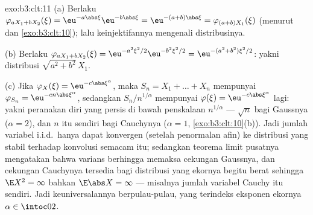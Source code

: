 \begin{solution}{exo:b3:clt:11}
(a) Berlaku $\varphi_{aX_1 + bX_2}(\xi) =
\eu^{-a\abs\xi}\eu^{-b\abs\xi} = \eu^{-(a+b)\abs\xi} =
\varphi_{(a+b)X_1}(\xi)$ (menurut  dan
\cref{exo:b3:clt:10}); lalu keinjektifannya mengenali distribusinya.

(b) Berlaku $\varphi_{aX_1+bX_2}(\xi) = \eu^{-a^2\xi^2/2}
\eu^{-b^2\xi^2/2} = \eu^{-(a^2+b^2)\xi^2/2}$: yakni distribusi
$\sqrt{a^2+b^2}\,X_1$.

(c) Jika $\varphi_X(\xi) = \eu^{-c\abs\xi^\alpha}$, maka
$S_n = X_1 + \dots + X_n$ mempunyai $\varphi_{S_n} =
\eu^{-cn\abs\xi^\alpha}$, sedangkan $S_n/n^{1/\alpha}$ mempunyai
$\varphi(\xi) = \eu^{-c\abs\xi^\alpha}$ lagi: yakni
peranakan diri yang persis di bawah penskalaan $n^{1/\alpha}$ ---
$\sqrt n$ bagi Gaussnya ($\alpha = 2$), dan $n$ itu sendiri bagi
Cauchynya ($\alpha = 1$, \cref{exo:b3:clt:10}(b)). Jadi jumlah
variabel i.i.d.\ hanya dapat konvergen (setelah penormalan
afin) ke distribusi yang stabil terhadap konvolusi
semacam itu; sedangkan teorema limit pusatnya mengatakan bahwa varians berhingga memaksa
cekungan Gaussnya, dan cekungan Cauchynya tersedia bagi distribusi
yang ekornya begitu berat sehingga $\E X^2 = \infty$ bahkan $\E\abs
X = \infty$ --- misalnya jumlah variabel Cauchy itu sendiri.
Jadi keuniversalannya berpulau-pulau, yang terindeks eksponen
ekornya $\alpha \in \intoc02$.
\end{solution}

